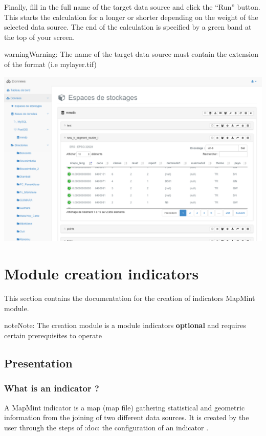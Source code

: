 \documentclass[letterpaper,10pt,english]{sphinxmanual}
\begin{document}
Finally, fill in the full name of the target data source and click the ``Run'' button. This starts the calculation for a longer or shorter depending on the weight of the selected data source. The end of the calculation is specified by a green band at the top of your screen.

\begin{notice}{warning}{Warning:}
The name of the target data source must contain the extension of the format (i.e mylayer.tif)
\end{notice}

\includegraphics[width=1.000\linewidth]{data-module-preview.png}


\chapter{Module creation indicators}
\label{indicators/index:indicators}\label{indicators/index::doc}\label{indicators/index:module-de-creation-d-indicateurs}
This section contains the documentation for the creation of indicators MapMint module.

\begin{notice}{note}{Note:}
The creation module is a module indicators \textbf{optional} and requires certain prerequisites to operate
\end{notice}


\section{Presentation}
\label{indicators/presentation:indicators-presentation}\label{indicators/presentation:presentation}\label{indicators/presentation::doc}

\subsection{What is an indicator ?}
\label{indicators/presentation:qu-est-ce-qu-un-indicateur}
A MapMint indicator is a map (map file) gathering statistical and geometric information from the joining of two different data sources. It is created by the user through the steps of :doc: the configuration of an indicator .
\end{document}
